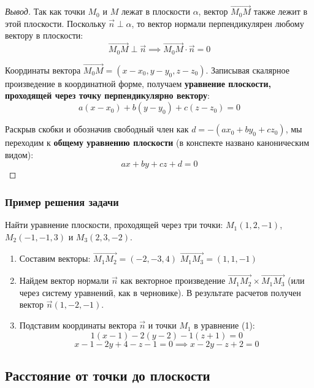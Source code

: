 \documentclass[12pt]{article}
\begin{document}
    \begin{proof}[Вывод]
    	Так как точки $M_0$ и $M$ лежат в плоскости $\alpha$, вектор $\vec{M_0M}$ также лежит в этой плоскости. Поскольку $\vec{n} \perp \alpha$, то вектор нормали перпендикулярен любому вектору в плоскости:
        \[
        \vec{M_0M} \perp \vec{n} \implies \vec{M_0M} \cdot \vec{n} = 0
        \]
        
        Координаты вектора $\vec{M_0M} = (x - x_0, y - y_0, z - z_0)$. Записывая скалярное произведение в координатной форме, получаем \textbf{уравнение плоскости, проходящей через точку перпендикулярно вектору}:
        \[
            \boxed{a(x - x_0) + b(y - y_0) + c(z - z_0) = 0}
        \]
        
        Раскрыв скобки и обозначив свободный член как $d = -(ax_0 + by_0 + cz_0)$, мы переходим к \textbf{общему уравнению плоскости} (в конспекте названо каноническим видом):
        \[
            ax + by + cz + d = 0
        \]
    \end{proof}

    \subsubsection{Пример решения задачи}
    
    \begin{problem}
    	Найти уравнение плоскости, проходящей через три точки: $M_1(1, 2, -1)$, $M_2(-1, -1, 3)$ и $M_3(2, 3, -2)$.
    \end{problem}
    
    \begin{solution}
    	\begin{enumerate}
			\item Составим векторы:
       		$\vec{M_1M_2} = (-2, -3, 4)$
       		$\vec{M_1M_3} = (1, 1, -1)$
			\item Найдем вектор нормали $\vec{n}$ как векторное произведение $\vec{M_1M_2} \times \vec{M_1M_3}$ (или через систему уравнений, как в черновике). В результате расчетов получен вектор $\vec{n}(1, -2, -1)$.
			\item Подставим координаты вектора $\vec{n}$ и точки $M_1$ в уравнение (1):
       		\[
				1(x - 1) - 2(y - 2) - 1(z + 1) = 0
			\]
       		\[
				x - 1 - 2y + 4 - z - 1 = 0 \implies x - 2y - z + 2 = 0
			\]
		\end{enumerate}
    \end{solution}
    
    \subsection{Расстояние от точки до плоскости}
    
\end{document}
